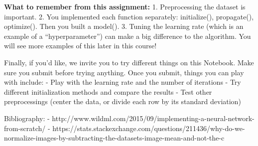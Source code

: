 \documentclass[11pt]{article}
\begin{document}
     \textbf{What to remember from this assignment:} 1. Preprocessing the
dataset is important. 2. You implemented each function separately:
initialize(), propagate(), optimize(). Then you built a model(). 3.
Tuning the learning rate (which is an example of a ``hyperparameter'')
can make a big difference to the algorithm. You will see more examples
of this later in this course!

    Finally, if you'd like, we invite you to try different things on this
Notebook. Make sure you submit before trying anything. Once you submit,
things you can play with include: - Play with the learning rate and the
number of iterations - Try different initialization methods and compare
the results - Test other preprocessings (center the data, or divide each
row by its standard deviation)

    Bibliography: -
http://www.wildml.com/2015/09/implementing-a-neural-network-from-scratch/
-
https://stats.stackexchange.com/questions/211436/why-do-we-normalize-images-by-subtracting-the-datasets-image-mean-and-not-the-c


    
    
    
    
\end{document}
